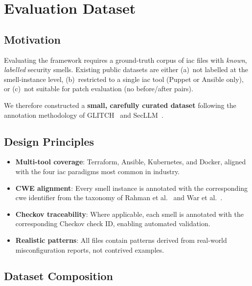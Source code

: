 \documentclass[12pt, a4paper]{report}
\begin{document}
\chapter{Evaluation Dataset}
\label{chap:dataset}

\section{Motivation}

Evaluating the framework requires a ground-truth corpus of \gls{iac} files with
\emph{known}, \emph{labelled} security smells. Existing public datasets are either
(a)~not labelled at the smell-instance level, (b)~restricted to a single \gls{iac}
tool (Puppet or Ansible only), or (c)~not suitable for patch evaluation (no
before/after pairs).

We therefore constructed a \textbf{small, carefully curated dataset} following the
annotation methodology of GLITCH~\citep{saavedra2022glitch} and SecLLM~\citep{devito2025secllm}.

\section{Design Principles}

\begin{itemize}
  \item \textbf{Multi-tool coverage}: Terraform, Ansible, Kubernetes, and Docker,
  aligned with the four \gls{iac} paradigms most common in industry.
  \item \textbf{CWE alignment}: Every smell instance is annotated with the
  corresponding \gls{cwe} identifier from the taxonomy of Rahman et al.~\citep{rahman2019seven}
  and War et al.~\citep{war2025taxonomy}.
  \item \textbf{Checkov traceability}: Where applicable, each smell is annotated with
  the corresponding Checkov check ID, enabling automated validation.
  \item \textbf{Realistic patterns}: All files contain patterns derived from real-world
  misconfiguration reports, not contrived examples.
\end{itemize}

\section{Dataset Composition}
\end{document}
